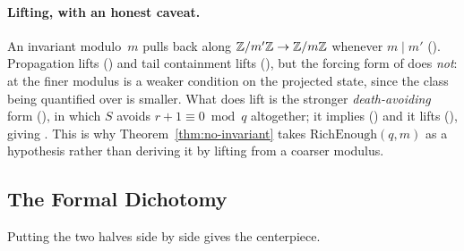 \paragraph{Lifting, with an honest caveat.}
An invariant modulo~$m$ pulls back along $\mathbb{Z}/m'\mathbb{Z} \to \mathbb{Z}/m\mathbb{Z}$
whenever $m \mid m'$
().  Propagation lifts
() and tail
containment lifts
(), but the
forcing form of  does \emph{not}:  at the
finer modulus is a weaker condition on the projected state, since the
class being quantified over is smaller.  What does lift is the stronger
\emph{death-avoiding} form
(), in which $S$ avoids
$r+1 \equiv 0 \bmod q$ altogether; it implies 
() and it
lifts (), giving
.
This is why Theorem~\ref{thm:no-invariant} takes
$\mathrm{RichEnough}(q,m)$ as a hypothesis rather than deriving it by
lifting from a coarser modulus.

\subsection{The Formal Dichotomy}
\label{sec:formal-dichotomy}

Putting the two halves side by side gives the centerpiece.

